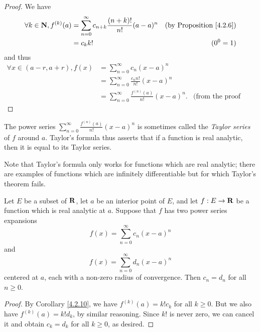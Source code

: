 \begin{proof}
    We have
    \begin{align*}
        \forall k \in \mathbf{N}, f^{(k)}(a) & = \sum_{n = 0}^\infty c_{n + k} \frac{(n + k)!}{n!} (a - a)^n & \text{(by Proposition \ref{4.2.6})} \\
                                     & = c_k k!                                                      & (0^0 = 1)
    \end{align*}
    and thus
    \begin{align*}
        \forall x \in (a - r, a + r), f(x) & = \sum_{n = 0}^\infty c_n (x - a)^n                                                    \\
                                           & = \sum_{n = 0}^\infty \frac{c_n n!}{n!} (x - a)^n                                      \\
                                           & = \sum_{n = 0}^\infty \frac{f^{(n)}(a)}{n!} (x - a)^n. & \text{(from the proof above)}
    \end{align*}
\end{proof}

\begin{note}
    The power series \(\sum_{n = 0}^\infty \frac{f^{(n)}(a)}{n!} (x - a)^n\) is sometimes called the \emph{Taylor series} of \(f\) around \(a\).
    Taylor's formula thus asserts that if a function is real analytic, then it is equal to its Taylor series.
\end{note}

\begin{remark}\label{4.2.11}
    Note that Taylor's formula only works for functions which are real analytic;
    there are examples of functions which are infinitely differentiable but for which Taylor's theorem fails.
\end{remark}

\begin{corollary}\label{4.2.12}
    Let \(E\) be a subset of \(\mathbf{R}\), let \(a\) be an interior point of \(E\), and let \(f : E \to \mathbf{R}\) be a function which is real analytic at \(a\).
    Suppose that \(f\) has two power series expansions
    \[
        f(x) = \sum_{n = 0}^\infty c_n (x - a)^n
    \]
    and
    \[
        f(x) = \sum_{n = 0}^\infty d_n (x - a)^n
    \]
    centered at \(a\), each with a non-zero radius of convergence.
    Then \(c_n = d_n\) for all \(n \geq 0\).
\end{corollary}

\begin{proof}
    By Corollary \ref{4.2.10}, we have \(f^{(k)}(a) = k! c_k\) for all \(k \geq 0\).
    But we also have \(f^{(k)}(a) = k! d_k\), by similar reasoning.
    Since \(k!\) is never zero, we can cancel it and obtain \(c_k = d_k\) for all \(k \geq 0\), as desired.
\end{proof}

